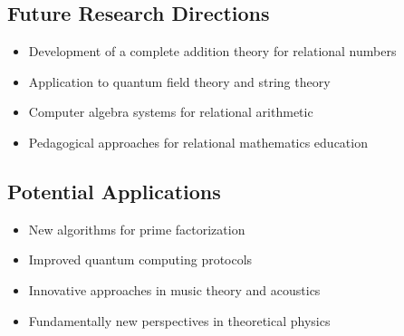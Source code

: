 \documentclass[11pt,a4paper]{article}
\begin{document}
	\subsection{Future Research Directions}
	
	\begin{itemize}
		\item Development of a complete addition theory for relational numbers
		\item Application to quantum field theory and string theory
		\item Computer algebra systems for relational arithmetic
		\item Pedagogical approaches for relational mathematics education
	\end{itemize}
	
	\subsection{Potential Applications}
	
	\begin{itemize}
		\item New algorithms for prime factorization
		\item Improved quantum computing protocols
		\item Innovative approaches in music theory and acoustics
		\item Fundamentally new perspectives in theoretical physics
	\end{itemize}
	
\end{document}
